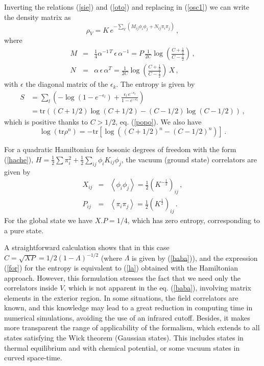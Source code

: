 \documentclass[11pt]{article}
\def\nn{\nonumber}
\begin{document}
 Inverting the relations (\ref{sie}) and (\ref{oto}) and replacing in (\ref{osc1}) we can write the density matrix as
\begin{equation}
\rho _{V}=K\,e^{-\sum_V \left( M_{ij} \phi_i \phi_j + N_{ij} \pi_i \pi_j \right)}\,,  \label{osc}
\end{equation}
where
\begin{eqnarray}
M&=&\frac{1}{4} \alpha^{-1\,T} \,\epsilon \,\alpha^{-1}=P\,\frac{1}{2 C}\log\left(\frac{C+\frac{1}{2}}{C-\frac{1}{2}}\right)\,,\\
N&=&\alpha \,\epsilon \,\alpha^T=\frac{1}{2 C}\log\left(\frac{C+\frac{1}{2}}{C-\frac{1}{2}}\right)\,X\,,
\end{eqnarray}
with $\epsilon$ the diagonal matrix of the $\epsilon_k$. The entropy is given by
\begin{align}
S &=\sum_l \left(-\log (1-e^{-\epsilon _{l}})+\frac{\epsilon _{l}\, e^{-\epsilon _{l}}}{
1-e^{-\epsilon _{l}}}\right)\nn\\
&=\textrm{tr}\left(( C+1/2)\log (C+1/2)-(C-1/2)\log (C-1/2)\right)\,,  \label{for}
\end{align}
which is positive thanks to  $C >1/2$, eq. (\ref{popo}). We also have
\begin{equation} 
\log (\textrm{tr}\rho^n)=-\textrm{tr}\left[ \log\left((C+1/2)^n-(C-1/2)^n\right)\right]\,.
\end{equation}

For a quadratic Hamiltonian for bosonic degrees of freedom with the form (\ref{hache}),   
$
H=\frac{1}{2}\sum \pi _{i}^{2}+\frac{1}{2}\sum_{ij}\phi _{i}K_{ij}\phi
_{j}$, the vacuum (ground state) correlators are given by 
\begin{eqnarray}
X_{ij} &=&\left\langle \phi _{i}\phi _{j}\right\rangle =\frac{1}{2}(K^{-
\frac{1}{2}})_{ij}\,,  \label{x} \\
P_{ij} &=&\left\langle \pi _{i}\pi _{j}\right\rangle =\frac{1}{2}(K^{\frac{1
}{2}})_{ij}\,. \label{p}
\end{eqnarray}
For the global state we have $X.P=1/4$, which has zero entropy, corresponding to a pure state. 

A straightforward calculation shows that in this case $C=\sqrt{XP}=1/2(1-\Lambda)^{-1/2}$ (where $\Lambda$ is given by (\ref{baba})), and the expression (\ref{for}) for the entropy is equivalent to (\ref{la}) obtained with the Hamiltonian approach. However, this formulation stresses the fact that we need only the correlators inside $V$, which is not apparent in the eq. (\ref{baba}), involving matrix elements in the exterior region. In some situations, the field correlators are known, and this knowledge may lead to a great reduction in computing time in numerical simulations, avoiding the use of an infrared cutoff. Besides, it makes more transparent the range of applicability of the formalism, which extends to all states satisfying the Wick theorem (Gaussian states). This includes states in thermal equilibrium and with chemical potential, or some vacuum states in curved space-time. 
 
\end{document}
